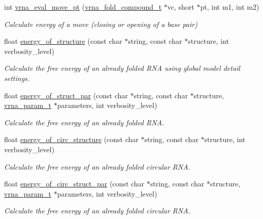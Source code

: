 \begin{DoxyCompactItemize}
int \hyperlink{group__eval_ga123dabc119ea98c968a5e903cc46f0fb}{vrna\+\_\+eval\+\_\+move\+\_\+pt} (\hyperlink{group__fold__compound_ga1b0cef17fd40466cef5968eaeeff6166}{vrna\+\_\+fold\+\_\+compound\+\_\+t} $\ast$vc, short $\ast$pt, int m1, int m2)
\begin{DoxyCompactList}\small\item\em Calculate energy of a move (closing or opening of a base pair) \end{DoxyCompactList}\item 
float \hyperlink{group__eval_gaf93986cb3cb29770ec9cca69c9fab8cf}{energy\+\_\+of\+\_\+structure} (const char $\ast$string, const char $\ast$structure, int verbosity\+\_\+level)
\begin{DoxyCompactList}\small\item\em Calculate the free energy of an already folded R\+NA using global model detail settings. \end{DoxyCompactList}\item 
float \hyperlink{group__eval_gaf9d064d3c496de42eca6734a96fd2090}{energy\+\_\+of\+\_\+struct\+\_\+par} (const char $\ast$string, const char $\ast$structure, \hyperlink{group__energy__parameters_ga8a69ca7d787e4fd6079914f5343a1f35}{vrna\+\_\+param\+\_\+t} $\ast$parameters, int verbosity\+\_\+level)
\begin{DoxyCompactList}\small\item\em Calculate the free energy of an already folded R\+NA. \end{DoxyCompactList}\item 
float \hyperlink{group__eval_gaeb14f3664aec67fc03268ac75253f0f8}{energy\+\_\+of\+\_\+circ\+\_\+structure} (const char $\ast$string, const char $\ast$structure, int verbosity\+\_\+level)
\begin{DoxyCompactList}\small\item\em Calculate the free energy of an already folded circular R\+NA. \end{DoxyCompactList}\item 
float \hyperlink{group__eval_ga3f01f9744ba6a40555eb4d81fc77f6df}{energy\+\_\+of\+\_\+circ\+\_\+struct\+\_\+par} (const char $\ast$string, const char $\ast$structure, \hyperlink{group__energy__parameters_ga8a69ca7d787e4fd6079914f5343a1f35}{vrna\+\_\+param\+\_\+t} $\ast$parameters, int verbosity\+\_\+level)
\begin{DoxyCompactList}\small\item\em Calculate the free energy of an already folded circular R\+NA. \end{DoxyCompactList}\item 

\end{DoxyCompactItemize}
